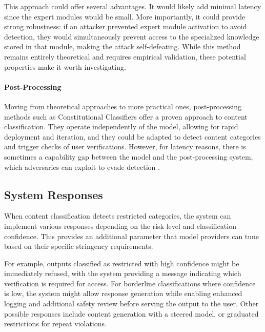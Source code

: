 \documentclass{article}
\theoremstyle{plain}
\theoremstyle{definition}
\theoremstyle{remark}
\begin{document}
This approach could offer several advantages.
It would likely add minimal latency since the expert modules would be small.
More importantly, it could provide strong robustness: if an attacker prevented expert module activation to avoid detection, they would simultaneously prevent access to the specialized knowledge stored in that module, making the attack self-defeating.
While this method remains entirely theoretical and requires empirical validation, these potential properties make it worth investigating.

\paragraph{Post-Processing}

Moving from theoretical approaches to more practical ones, post-processing methods such as Constitutional Classifiers \cite{sharma2025constitutionalclassifiersdefendinguniversal} offer a proven approach to content classification.
They operate independently of the model, allowing for rapid deployment and iteration, and they could be adapted to detect content categories and trigger checks of user verifications.
However, for latency reasons, there is sometimes a capability gap between the model and the post-processing system, which adversaries can exploit to evade detection \cite{jin2024jailbreakinglargelanguagemodels, kumar2025freelunchguardrails}.

\subsection{System Responses} \label{section:system-responses}

When content classification detects restricted categories, the system can implement various responses depending on the risk level and classification confidence.
This provides an additional parameter that model providers can tune based on their specific stringency requirements.

For example, outputs classified as restricted with high confidence might be immediately refused, with the system providing a message indicating which verification is required for access.
For borderline classifications where confidence is low, the system might allow response generation while enabling enhanced logging and additional safety review before serving the output to the user.
Other possible responses include content generation with a steered model, or graduated restrictions for repeat violations.
\end{document}
